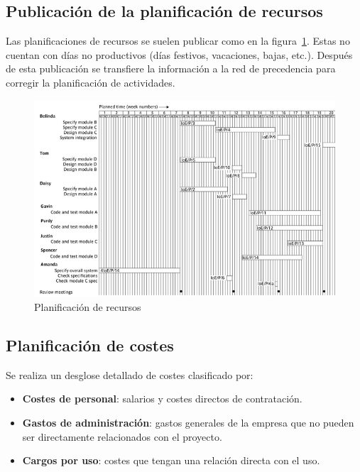\documentclass[12pt]{article}
\begin{document}
\subsection{Publicación de la planificación de recursos}
\label{8.8.0}

{Las planificaciones de recursos se suelen publicar como en la figura~\ref{fig:8.3}. Estas no cuentan con días no productivos (días festivos, vacaciones, bajas, etc.). Después de esta publicación se transfiere la información a la red de precedencia para corregir la planificación de actividades.}

\begin{figure} [ht]
    \centering
    \includegraphics[keepaspectratio=true, scale=0.75]{images/plan_de_recursos.png}
    \caption{Planificación de recursos}
    \label{fig:8.3}
\end{figure}

\newpage
\subsection{Planificación de costes}
\label{8.9.0}

{Se realiza un desglose detallado de costes clasificado por:}

\begin{itemize}
    \item {\textbf{Costes de personal}: salarios y costes directos de contratación.}
    \item {\textbf{Gastos de administración}: gastos generales de la empresa que no pueden ser directamente relacionados con el proyecto.}
    \item {\textbf{Cargos por uso}: costes que tengan una relación directa con el uso.}
\end{itemize}
\end{document}
